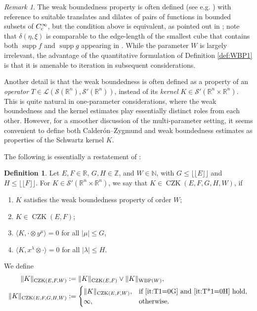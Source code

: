 \documentclass[11pt, reqno]{amsart}
\theoremstyle{definition}
\newtheorem{definition}[theorem]{Definition}
\theoremstyle{remark}
\newtheorem{remark}[theorem]{Remark}
\numberwithin{equation}{section}
\newcommand{\N}{\mathbb N}
\newcommand{\R}{\mathbb R}
\newcommand{\Z}{\mathbb Z}
\newcommand{\supp}{\operatorname{supp}}
\newcommand{\Floor}[1]{\lfloor\!\lfloor #1 \rfloor\!\rfloor}
\newcommand{\pair}[2]{\langle #1, #2 \rangle}
\newcommand{\abs}[1]{|#1|}
\newcommand{\Norm}[2]{\|#1\|_{#2}}
\begin{document}
\begin{remark}\label{rem:WBP1}
The weak boundedness property is often defined (see e.g. \cite[Definition 4]{Journe}) with reference to suitable translates and dilates of pairs of functions in bounded subsets of $C_{\rm c}^\infty$, but the condition above is equivalent, as pointed out in \cite[(1.9)]{Journe}; note that $\delta(\eta,\xi)$ is comparable to the edge-length of the smallest cube that contains both $\supp f$ and $\supp g$ appearing in \cite[(1.9)]{Journe}. While the parameter $W$ is largely irrelevant, the advantage of the quantitative formulation of Definition \ref{def:WBP1} is that it is amenable to iteration in subsequent considerations.

Another detail is that the weak boundedness is often defined as a property of an {\em operator} $T\in\mathcal L(\mathscr S(\R^n),\mathscr S'(\R^n))$, instead of its {\em kernel} $K\in\mathscr S'(\R^n\times\R^n)$. This is quite natural in one-parameter considerations, where the weak boundedness and the kernel estimates play essentially distinct roles from each other. However, for a smoother discussion of the multi-parameter setting, it seems convenient to define both Calder\'on--Zygmund and weak boundedness estimates as properties of the Schwartz kernel $K$.
\end{remark}

The following is essentially a restatement of \cite[Definition 6.17]{BHYY:1c}:

\begin{definition}\label{def:CZEFGH}
Let $E,F\in\R$, $G,H\in\Z$, and $W\in\N$, with $G\leq\Floor{E}$ and $H\leq\Floor{F}$.
For $K\in\mathscr S'(\R^n\times\R^n)$, we say that $K\in\operatorname{CZK}(E,F,G,H,W)$, if
\begin{enumerate}[\rm(i)]
  \item $K$ satisfies the weak boundedness property of order $W$;
  \item $K\in\operatorname{CZK}(E,F)$;
  \item\label{it:T1=0G} $\pair{K}{\cdot\otimes y^\mu}=0$ for all $\abs{\mu}\leq G$,
  \item\label{it:T*1=0H} $\pair{K}{x^\lambda\otimes\cdot}=0$ for all $\abs{\lambda}\leq H$.
\end{enumerate}
We define
\begin{equation*}
\begin{split}
  \Norm{K}{\operatorname{CZK}(E,F,W)}
  &:=\Norm{K}{\operatorname{CZK}(E,F)}\vee\Norm{K}{\operatorname{WBP}(W)}, \\
  \Norm{K}{\operatorname{CZK}(E,F,G,H,W)}
  &:=\begin{cases}
   \Norm{K}{\operatorname{CZK}(E,F,W)}, &
    \text{if \eqref{it:T1=0G} and \eqref{it:T*1=0H} hold}, \\
    \infty, & \text{otherwise}. \end{cases}
\end{split}
\end{equation*}
\end{definition}
\end{document}
